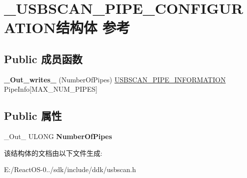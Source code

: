 \hypertarget{struct___u_s_b_s_c_a_n___p_i_p_e___c_o_n_f_i_g_u_r_a_t_i_o_n}{}\section{\+\_\+\+U\+S\+B\+S\+C\+A\+N\+\_\+\+P\+I\+P\+E\+\_\+\+C\+O\+N\+F\+I\+G\+U\+R\+A\+T\+I\+O\+N结构体 参考}
\label{struct___u_s_b_s_c_a_n___p_i_p_e___c_o_n_f_i_g_u_r_a_t_i_o_n}
\subsection*{Public 成员函数}
\begin{DoxyCompactItemize}
\item 
\mbox{\label{struct___u_s_b_s_c_a_n___p_i_p_e___c_o_n_f_i_g_u_r_a_t_i_o_n_ab09781bf299969d0b6ca30f6c15e75da}} 
{\bfseries \+\_\+\+Out\+\_\+writes\+\_\+} (Number\+Of\+Pipes) \hyperlink{struct___u_s_b_s_c_a_n___p_i_p_e___i_n_f_o_r_m_a_t_i_o_n}{U\+S\+B\+S\+C\+A\+N\+\_\+\+P\+I\+P\+E\+\_\+\+I\+N\+F\+O\+R\+M\+A\+T\+I\+ON} Pipe\+Info\mbox{[}M\+A\+X\+\_\+\+N\+U\+M\+\_\+\+P\+I\+P\+ES\mbox{]}
\end{DoxyCompactItemize}
\subsection*{Public 属性}
\begin{DoxyCompactItemize}
\item 
\mbox{\label{struct___u_s_b_s_c_a_n___p_i_p_e___c_o_n_f_i_g_u_r_a_t_i_o_n_a838b8248a0410769e2141edd1bea467c}} 
\+\_\+\+Out\+\_\+ U\+L\+O\+NG {\bfseries Number\+Of\+Pipes}
\end{DoxyCompactItemize}


该结构体的文档由以下文件生成\+:\begin{DoxyCompactItemize}
\item 
E\+:/\+React\+O\+S-\/0../sdk/include/ddk/usbscan.\+h\end{DoxyCompactItemize}
